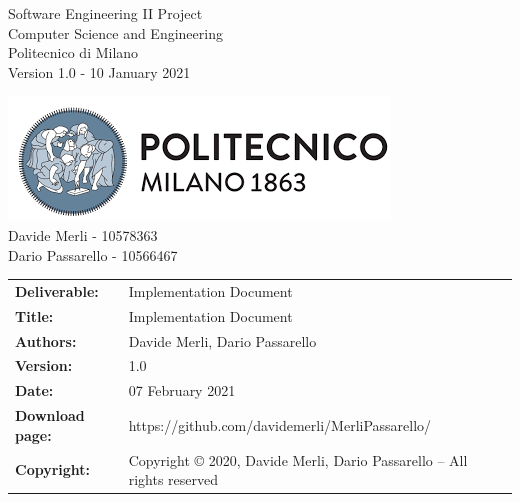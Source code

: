 \begin{titlepage}
\begin{center}
    \begin{multicols}{2}
      \large
      \begin{flushleft}
        Software Engineering II Project \\
        Computer Science and Engineering\\
        Politecnico di Milano\\
        Version 1.0 - 10 January 2021 \\
      \end{flushleft}
      \begin{flushright}
        \includegraphics[scale=0.6]{Images/PolimiLogo.png} \\
        Davide Merli - 10578363\\
        Dario Passarello - 10566467 \\
      \end{flushright}
    \end{multicols}
  \end{center}

\end{titlepage}

\begin{table}[h!]
  \begin{tabu} to \textwidth { X[0.4,r,p] X[0.7,l,p] }
    \hline

    \textbf{Deliverable:}   & Implementation Document                                                \\
    \textbf{Title:}         & Implementation Document                                                \\
    \textbf{Authors:}       & Davide Merli, Dario Passarello                                         \\
    \textbf{Version:}       & 1.0                                                                    \\
    \textbf{Date:}          & 07 February 2021                                                       \\
    \textbf{Download page:} & https://github.com/davidemerli/MerliPassarello/                        \\
    \textbf{Copyright:}     & Copyright © 2020, Davide Merli, Dario Passarello – All rights reserved \\
    \hline
  \end{tabu}
\end{table}




